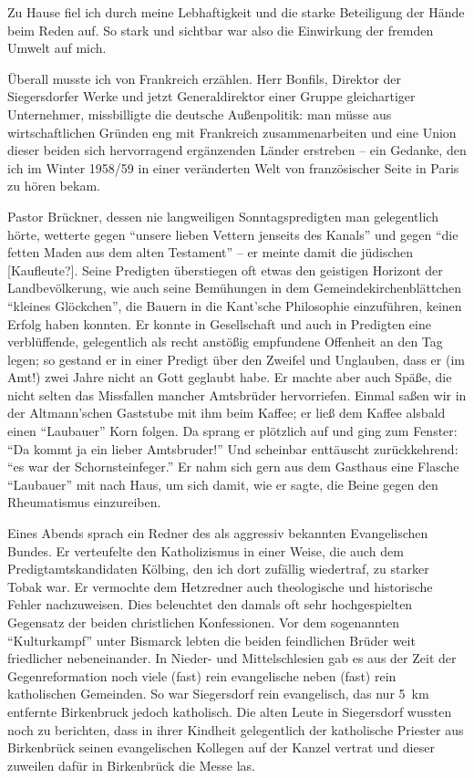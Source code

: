Zu Hause fiel ich durch meine Lebhaftigkeit und die starke Beteiligung der Hände beim Reden auf. So stark und sichtbar war also die Einwirkung der fremden Umwelt auf mich.

Überall musste ich von Frankreich erzählen. Herr Bonfils, Direktor der Siegersdorfer Werke und jetzt Generaldirektor einer Gruppe gleichartiger Unternehmer, missbilligte die deutsche Außenpolitik: man müsse aus wirtschaftlichen Gründen eng mit Frankreich zusammenarbeiten und eine Union dieser beiden sich hervorragend ergänzenden Länder erstreben -- ein Gedanke, den ich im Winter 1958/59 in einer veränderten Welt von französischer Seite in Paris zu hören bekam.

Pastor Brückner, dessen nie langweiligen Sonntagspredigten man gelegentlich hörte, wetterte gegen \enquote{unsere lieben Vettern jenseits des Kanals} und gegen \enquote{die fetten Maden aus dem alten Testament} -- er meinte damit die jüdischen [Kaufleute?]. Seine Predigten überstiegen oft etwas den geistigen Horizont der Landbevölkerung, wie auch seine Bemühungen in dem Gemeindekirchenblättchen \enquote{kleines Glöckchen}, die Bauern in die Kant'sche Philosophie einzuführen, keinen Erfolg haben konnten. Er konnte in Gesellschaft und auch in Predigten eine verblüffende, gelegentlich als recht anstößig empfundene Offenheit an den Tag legen; so gestand er in einer Predigt über den Zweifel und Unglauben, dass er (im Amt!) zwei Jahre nicht an Gott geglaubt habe. Er machte aber auch Späße, die nicht selten das Missfallen mancher Amtsbrüder hervorriefen. Einmal saßen wir in der Altmann'schen Gaststube mit ihm beim Kaffee; er ließ dem Kaffee alsbald einen \enquote{Laubauer} Korn folgen. Da sprang er plötzlich auf und ging zum Fenster: \enquote{Da kommt ja ein lieber Amtsbruder!} Und scheinbar enttäuscht zurückkehrend: \enquote{es war der Schornsteinfeger.} Er nahm sich gern aus dem Gasthaus eine Flasche \enquote{Laubauer} mit nach Haus, um sich damit, wie er sagte, die Beine gegen den Rheumatismus einzureiben.

Eines Abends sprach ein Redner des als aggressiv bekannten Evangelischen Bundes. Er verteufelte den Katholizismus in einer Weise, die auch dem Predigtamtskandidaten Kölbing, den ich dort zufällig wiedertraf, zu starker Tobak war. Er vermochte dem Hetzredner auch theologische und historische Fehler nachzuweisen. Dies beleuchtet den damals oft sehr hochgespielten Gegensatz der beiden christlichen Konfessionen. Vor dem sogenannten \enquote{Kulturkampf} unter Bismarck lebten die beiden feindlichen Brüder weit friedlicher nebeneinander. In Nieder- und Mittelschlesien gab es aus der Zeit der Gegenreformation noch viele (fast) rein evangelische neben (fast) rein katholischen Gemeinden. So war Siegersdorf rein evangelisch, das nur 5~km entfernte Birkenbruck jedoch katholisch. Die alten Leute in Siegersdorf wussten noch zu berichten, dass in ihrer Kindheit gelegentlich der katholische Priester aus Birkenbrück seinen evangelischen Kollegen auf der Kanzel vertrat und dieser zuweilen dafür in Birkenbrück die Messe las.

